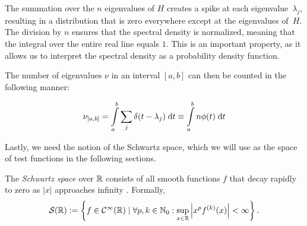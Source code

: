 The summation over the $n$ eigenvalues of $H$ creates a spike at each eigenvalue~$\lambda_j$, resulting in a distribution that is zero everywhere except at the eigenvalues of~$H$. The division by $n$ ensures that the spectral density is normalized, meaning that the integral over the entire real line equals $1$. This is an important property, as it allows us to interpret the spectral density as a probability density function.

The number of eigenvalues $\nu$ in an interval $[a, b]$ can then be counted in the following manner:

\begin{equation} \label{nu_a_b}
    \nu_{[a, b]} = \int\limits_a^b \sum_j \delta(t - \lambda_j) \;\mathrm{d}t \equiv \int\limits_a^b n \phi(t) \;\mathrm{d}t
\end{equation}

Lastly, we need the notion of the Schwartz space, which we will use as the space of test functions in the following sections.

\begin{definition} \label{def:Schwartz space}
    The \emph{Schwartz space} over $\mathbb{R}$ consists of all smooth functions $f$ that decay rapidly to zero as $|x|$ approaches infinity \cite{richtmyer}.
    Formally,
    \[
    \mathcal{S}(\mathbb{R}) := \left\{f \in \mathcal{C}^{\infty}(\mathbb{R}) \mid \forall p, k \in \mathbb{N}_0: \sup_{x \in \mathbb{R}} \left| x^p f^{(k)}(x) \right| < \infty \right\}.
    \]
\end{definition}
